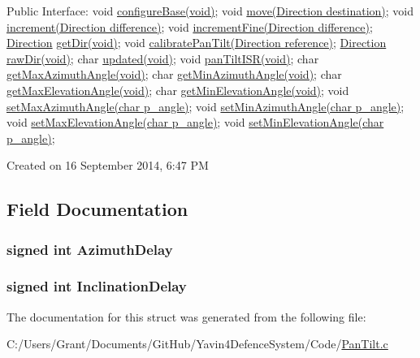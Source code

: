 Public Interface\+: void \hyperlink{PanTilt_8h_ab7b8c8f7bf051b4f8e3b151f7b567127}{configure\+Base(void)}; void \hyperlink{PanTilt_8h_a032fbfc434ca24d27d89b6d768455a42}{move(\+Direction destination)}; void \hyperlink{PanTilt_8h_af8e57fbe1513bb48274f4f0f46717fa1}{increment(\+Direction difference)}; void \hyperlink{PanTilt_8h_a5350e3f473fb25899612d382c1baa642}{increment\+Fine(\+Direction difference)}; \hyperlink{structDirection}{Direction} \hyperlink{PanTilt_8h_ad1d9638bad5a5021969d19769e70c775}{get\+Dir(void)}; void \hyperlink{PanTilt_8h_a60e08860a1b4ca9efdc2dd43983731d5}{calibrate\+Pan\+Tilt(\+Direction reference)}; \hyperlink{structDirection}{Direction} \hyperlink{PanTilt_8h_a251ee95d75c68e21c4bb933ac99e5108}{raw\+Dir(void)}; char \hyperlink{PanTilt_8h_a3362a0aacdd7037d0329989d353c60b7}{updated(void)}; void \hyperlink{PanTilt_8h_a7f353056fb02f0d95fd997198f5b186f}{pan\+Tilt\+I\+S\+R(void)}; char \hyperlink{PanTilt_8h_ae8f9ea5919de15d1b5614be2e5e65be3}{get\+Max\+Azimuth\+Angle(void)}; char \hyperlink{PanTilt_8h_af45dd498eebe7f5ba7b228c15e7221c1}{get\+Min\+Azimuth\+Angle(void)}; char \hyperlink{PanTilt_8h_a4278dbef7fe9034a7a54d02bcbb16de9}{get\+Max\+Elevation\+Angle(void)}; char \hyperlink{PanTilt_8h_af7fafa63e9c645a80f28aca253bba5cc}{get\+Min\+Elevation\+Angle(void)}; void \hyperlink{PanTilt_8h_a1f5e600a2655aeb9dd24b8325a777931}{set\+Max\+Azimuth\+Angle(char p\+\_\+angle)}; void \hyperlink{PanTilt_8h_a157ea38d68fcd31082dc2eaba2944ef3}{set\+Min\+Azimuth\+Angle(char p\+\_\+angle)}; void \hyperlink{PanTilt_8h_aa956697480994a26cb592b2cfcf3436c}{set\+Max\+Elevation\+Angle(char p\+\_\+angle)}; void \hyperlink{PanTilt_8h_a001917f3c38b200d142ab6932991e001}{set\+Min\+Elevation\+Angle(char p\+\_\+angle)};

Created on 16 September 2014, 6\+:47 P\+M 

\subsection{Field Documentation}
\hypertarget{structDelay_aacc83952fc6c5812597bc96d622f5317}{
\subsubsection[{Azimuth\+Delay}]{\setlength{\rightskip}{0pt plus 5cm}signed int Azimuth\+Delay}}\label{structDelay_aacc83952fc6c5812597bc96d622f5317}
\hypertarget{structDelay_a4f5b10a6a07a4aaed02134ab2691b8ec}{
\subsubsection[{Inclination\+Delay}]{\setlength{\rightskip}{0pt plus 5cm}signed int Inclination\+Delay}}\label{structDelay_a4f5b10a6a07a4aaed02134ab2691b8ec}


The documentation for this struct was generated from the following file\+:\begin{DoxyCompactItemize}
\item 
C\+:/\+Users/\+Grant/\+Documents/\+Git\+Hub/\+Yavin4\+Defence\+System/\+Code/\hyperlink{PanTilt_8c}{Pan\+Tilt.\+c}\end{DoxyCompactItemize}
